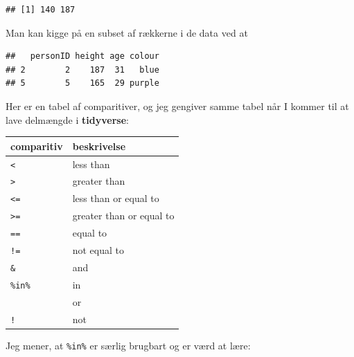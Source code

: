 \documentclass[
]{book}
\newenvironment{Shaded}{\begin{snugshade}}{\end{snugshade}}
\newcommand{\CommentTok}[1]{\textcolor[rgb]{0.56,0.35,0.01}{\textit{#1}}}
\newcommand{\DecValTok}[1]{\textcolor[rgb]{0.00,0.00,0.81}{#1}}
\newcommand{\FunctionTok}[1]{\textcolor[rgb]{0.13,0.29,0.53}{\textbf{#1}}}
\newcommand{\NormalTok}[1]{#1}
\newcommand{\SpecialCharTok}[1]{\textcolor[rgb]{0.81,0.36,0.00}{\textbf{#1}}}
\theoremstyle{definition}
\theoremstyle{definition}
\theoremstyle{definition}
\theoremstyle{definition}
\theoremstyle{remark}
\begin{document}
\begin{verbatim}
## [1] 140 187
\end{verbatim}

Man kan kigge på en subset af rækkerne i de data ved at

\begin{Shaded}
\end{Shaded}

\begin{verbatim}
##   personID height age colour
## 2        2    187  31   blue
## 5        5    165  29 purple
\end{verbatim}

Her er en tabel af comparitiver, og jeg gengiver samme tabel når I kommer til at lave delmængde i \textbf{tidyverse}:

\begin{longtable}[]{@{}ll@{}}
\toprule\noalign{}
comparitiv & beskrivelse \\
\midrule\noalign{}
\endhead
\bottomrule\noalign{}
\endlastfoot
\texttt{\textless{}} & less than \\
\texttt{\textgreater{}} & greater than \\
\texttt{\textless{}=} & less than or equal to \\
\texttt{\textgreater{}=} & greater than or equal to \\
\texttt{==} & equal to \\
\texttt{!=} & not equal to \\
\texttt{\&} & and \\
\texttt{\%in\%} & in \\
\texttt{\textbar{}} & or \\
\texttt{!} & not \\
\end{longtable}

Jeg mener, at \texttt{\%in\%} er særlig brugbart og er værd at lære:

\begin{Shaded}
\end{Shaded}
\end{document}
